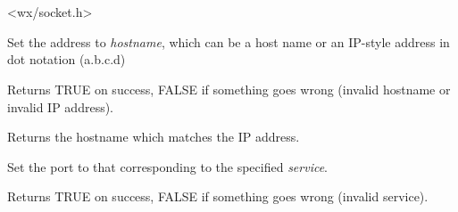 \section{}\label{wxipv4address}




<wx/socket.h>


%
%



Set the address to {\it hostname}, which can be a host name
or an IP-style address in dot notation (a.b.c.d)


Returns TRUE on success, FALSE if something goes wrong
(invalid hostname or invalid IP address).

%
%



Returns the hostname which matches the IP address.

%
%



Set the port to that corresponding to the specified {\it service}.


Returns TRUE on success, FALSE if something goes wrong
(invalid service).

%
%



